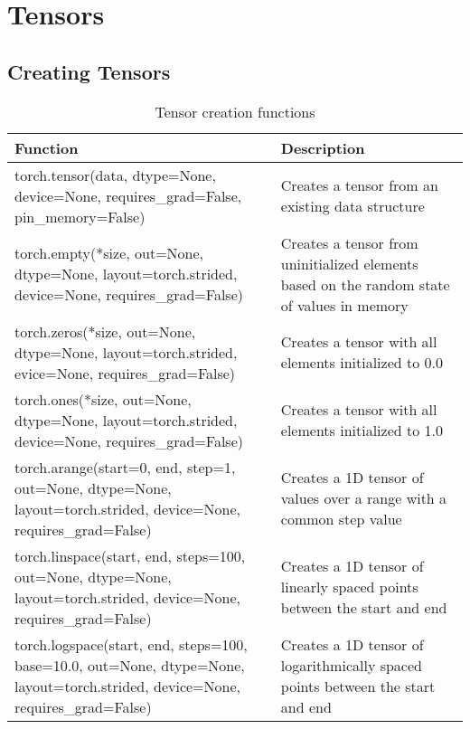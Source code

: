 \chapter{Tensors\label{Ch02}}
\section{Creating Tensors}
\begin{table}
    \centering
    \caption{Tensor creation functions}
    \begin{tabularx}{\textwidth}{XX}
        \hline
        Function                                                                                                                                 & Description                                                                                \\
        \hline
        \textsf{torch.tensor(data, dtype=None, device=None, requires\_grad=False, pin\_memory=False)}                                            & Creates a tensor from an existing data structure                                           \\
        \textsf{torch.empty(*size, out=None, dtype=None, layout=torch.strided, device=None, requires\_grad=False)}                               & Creates a tensor from uninitialized elements based on the random state of values in memory \\
        \textsf{torch.zeros(*size, out=None, dtype=None, layout=torch.strided, evice=None, requires\_grad=False)}                                & Creates a tensor with all elements initialized  to 0.0                                     \\
        \textsf{torch.ones(*size, out=None, dtype=None, layout=torch.strided, device=None, requires\_grad=False)}                                & Creates a tensor with all elements initialized to 1.0                                      \\
        \textsf{torch.arange(start=0, end, step=1, out=None, dtype=None, layout=torch.strided, device=None, requires\_grad=False)}               & Creates a 1D tensor of values over a range with a common step value                        \\
        \textsf{torch.linspace(start, end, steps=100, out=None, dtype=None, layout=torch.strided, device=None, requires\_grad=False)}            & Creates a 1D tensor of linearly spaced points between the start and end                    \\
        \textsf{torch.logspace(start, end, steps=100, base=10.0, out=None, dtype=None, layout=torch.strided, device=None, requires\_grad=False)} & Creates a 1D tensor of logarithmically spaced points between the start and end             \\

\end{tabularx}
\end{table}
